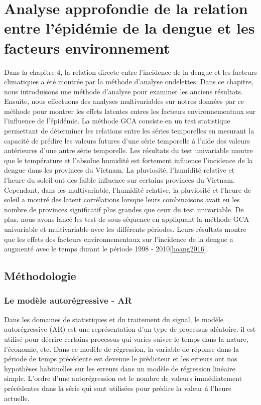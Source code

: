 \chapter{Analyse approfondie de la relation entre l'épidémie de la dengue et les facteurs environnement }
\label{chap5}
Dans la chapitre 4, la relation directe entre l'incidence de la dengue et les facteurs climatiques a été montrée par la méthode d'analyse ondelettes.  Dans ce chapitre, nous introduisons une méthode d'analyse pour examiner les anciens résultats. Ensuite, nous effectuons des analyses multivariables sur notres données par ce méthode pour montrer les effets latentes entres les facteurs environnementaux sur l'influence de l'épidémie. 
La méthode GCA consiste en un test statistique permettant de déterminer les relations entre les séries temporelles en mesurant la capacité de prédire les valeurs futures d'une série temporelle à l'aide des valeurs antérieures d'une autre série temporelle. Les résultats du test univariable montre que le température et l'absolue humidité est fortement influence l'incidence de la dengue dans les provinces du Vietnam. La pluviosité, l'humidité relative et l'heure du soleil ont des faible influence sur certains provinces du Vietnam. Cependant, dans les multivariable, l'humidité relative, la pluviosité et l'heure de soleil a montré des latent corrélations lorsque leurs combinaisons avait eu les nombre de provinces significatif plus grandes que ceux du test univariable. De plus, nous avons lancé les test de sous-séquence en appliquant la méthode GCA univariable et multivariable avec les différents périodes. Leurs résultats montre que les effets des facteurs environnementaux sur l'incidence de la dengue a augmenté avec le temps durant le période 1998 - 2010\ref{hoang2016}. 

\section{Méthodologie}
\subsection{Le modèle  autorégressive - AR}
Dans les domaines de statistiques et du traitement du signal, le modèle autorégressive (AR) est une représentation d'un type de processus aléatoire. il est utilisé pour décrire certains processus  qui varies suivre le temps dans la nature, l'économie, etc. Dans ce modèle de régression, la variable de réponse dans la période de temps précédente est devenue le prédicteur et les erreurs ont nos hypothèses habituelles sur les erreurs dans un modèle de régression linéaire simple. L'ordre d'une autorégression est le nombre de valeurs immédiatement précédentes dans la série qui sont utilisées pour prédire la valeur à l'heure actuelle. 

